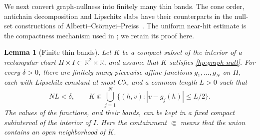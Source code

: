\documentclass[11pt]{article}
\numberwithin{equation}{section}
\newtheorem{lemma}[theorem]{Lemma}
\theoremstyle{definition}
\theoremstyle{remark}
\begin{document}
We next convert graph-nullness into finitely many thin bands.  The
cone order, antichain decomposition and Lipschitz slabs have their
counterparts in the null-set constructions of
Alberti--Cs\"ornyei--Preiss~\cite[Sections~2.2 and~3]{AlbertiCsornyeiPreiss2010}.
The uniform near-hit estimate is the compactness mechanism used in
\cite[Lemma~4.12, Step~1]{AlbertiMarchese2016}; we retain its proof here.

\begin{lemma}[Finite thin bands]\label{hp:thin-bands}
Let $K$ be a compact subset of the interior of a rectangular chart
$H\times I\subset\mathbb R^2\times\mathbb R$, and assume that $K$ satisfies
\eqref{hp:graph-null}.  For every $\delta>0$, there are finitely many
piecewise affine functions $g_1,\dots,g_N$ on $H$, each with
Lipschitz constant at most $C\lambda$, and a common length $L>0$
such that
\[
 NL<\delta,
 \qquad
 K\Subset\bigcup_{j=1}^N
       \{(h,v):|v-g_j(h)|\le L/2\}.
\]
The values of the functions, and their bands, can be kept in a fixed
compact subinterval of the interior of $I$.  Here the containment
$\Subset$ means that the union contains an open neighborhood of $K$.
\end{lemma}
\end{document}
